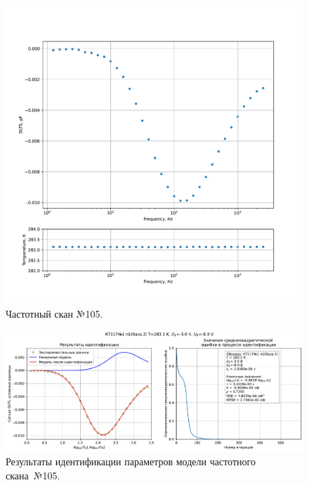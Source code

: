 \begin{figure}[!ht]
    \centering
    \includegraphics[width=1\textwidth]{../plots/КТ117№1_п1(база 2)_2500Гц-1Гц_1пФ_+10С_-3В-8В_200мВ_20мкс_шаг_0,1.pdf}
    \caption{Частотный скан №105.}
    \label{pic:frequency_scan_105}
\end{figure}

\begin{figure}[!ht]
    \centering
    \includegraphics[width=1\textwidth]{../plots/КТ117№1_п1(база 2)_2500Гц-1Гц_1пФ_+10С_-3В-8В_200мВ_20мкс_шаг_0,1_model.pdf}
    \caption{Результаты идентификации параметров модели частотного скана~№105.}
    \label{pic:frequency_scan_model105}
\end{figure}

\pagebreak


